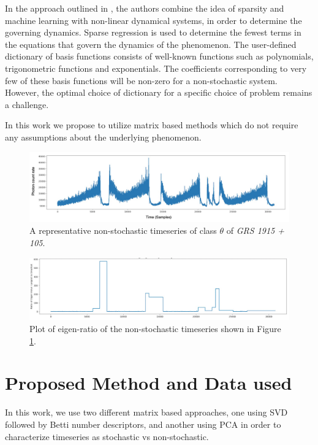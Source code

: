 \documentclass[10pt,conference]{IEEEtran}
\begin{document}
In the approach outlined in \cite{Brunton2016}, the authors combine the idea of sparsity and machine learning with non-linear dynamical systems, in order to determine the governing dynamics. Sparse regression is used to determine the fewest terms in the equations that govern the dynamics of the phenomenon. The user-defined dictionary of basis functions consists of well-known functions such as polynomials, trigonometric functions and exponentials. The coefficients corresponding to very few of these basis functions will be non-zero for a non-stochastic system. However, the optimal choice of dictionary for a specific choice of problem remains a challenge.

In this work we propose to utilize matrix based methods which do not require any assumptions about the underlying phenomenon.

\begin{figure}[ht]
  \centering
  \includegraphics[width=0.8\linewidth]{theta_ts_edited.drawio.png}
  \caption{A representative non-stochastic timeseries of class $\theta$ of \textit{GRS 1915 + 105}. }
  \label{theta_ts}
\end{figure}
\begin{figure}[ht]
  \centering
  \includegraphics[width=0.8\linewidth]{theta_ts_eig.png}
  \caption{Plot of eigen-ratio of the  non-stochastic timeseries shown in Figure \ref{theta_ts}. }
  \label{theta_eig}
\end{figure}

\section{Proposed Method and Data used}

In this work, we use two different matrix based approaches, one using SVD followed by  Betti number descriptors, and  another using PCA in order to characterize timeseries as stochastic vs non-stochastic.
\end{document}

